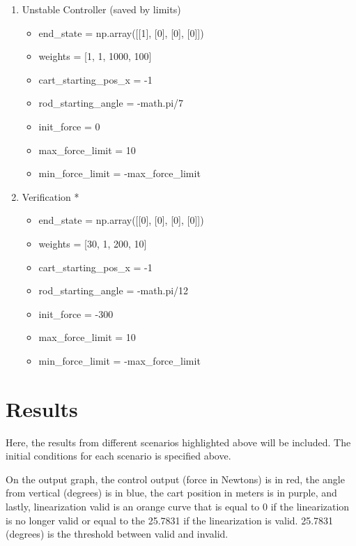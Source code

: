 \documentclass{article}
\begin{document}
\begin{enumerate}
    \item Unstable Controller (saved by limits)
        \begin{itemize}
            \item end\_state = np.array([[1], [0], [0], [0]])
            \item weights = [1, 1, 1000, 100]
            \item cart\_starting\_pos\_x = -1
            \item rod\_starting\_angle = -math.pi/7
            \item init\_force = 0
            \item max\_force\_limit = 10
            \item min\_force\_limit = -max\_force\_limit
        \end{itemize}
        
    \item Verification *
        \begin{itemize}
            \item end\_state = np.array([[0], [0], [0], [0]])
            \item weights = [30, 1, 200, 10]
            \item cart\_starting\_pos\_x = -1
            \item rod\_starting\_angle = -math.pi/12
            \item init\_force = -300
            \item max\_force\_limit = 10
            \item min\_force\_limit = -max\_force\_limit
        \end{itemize}

\end{enumerate}

\section{Results}

Here, the results from different scenarios highlighted above will be included. The initial conditions for each scenario is specified above.

On the output graph, the control output (force in Newtons) is in red, the angle from vertical (degrees) is in blue, the cart position in meters is in purple, and lastly, linearization valid is an orange curve that is equal to 0 if the linearization is no longer valid or equal to the 25.7831 if the linearization is valid. 25.7831 (degrees) is the threshold between valid and invalid.
\end{document}

